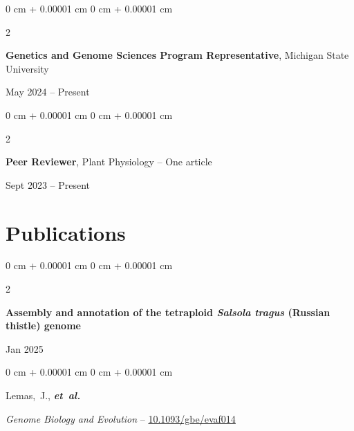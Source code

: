 \documentclass[10pt, letterpaper]{article}
\newenvironment{onecolentry}{
    \begin{adjustwidth}{
        0 cm + 0.00001 cm
    }{
        0 cm + 0.00001 cm
    }
}{
    \end{adjustwidth}
} %
\newenvironment{twocolentry}[2][]{
    \onecolentry
    \def\secondColumn{#2}
    \setcolumnwidth{\fill, 4.5 cm}
    \begin{paracol}{2}
}{
    \switchcolumn \raggedleft \secondColumn
    \end{paracol}
    \endonecolentry
} %
\begin{document}
        
        \begin{samepage} 
            \begin{twocolentry}{
                May 2024 – Present
                }
                \textbf{Genetics and Genome Sciences Program Representative}, Michigan State University
            \end{twocolentry}
        \end{samepage}  


        \vspace{0.2 cm}


        \begin{samepage} 
            \begin{twocolentry}{
                Sept 2023 – Present
                }
                \textbf{Peer Reviewer}, Plant Physiology -- One article
            \end{twocolentry}
        \end{samepage}
      
        

            
    \section{Publications}





        \begin{samepage}
            \begin{twocolentry}{
                Jan 2025
                }
                \textbf{Assembly and annotation of the tetraploid \textit{Salsola tragus} (Russian thistle) genome}
            \end{twocolentry}

            \vspace{0.10 cm}
            
            \begin{onecolentry}
                \mbox{Lemas, J.}, \mbox{\textbf{\textit{et al.}}}

                \vspace{0.10 cm}
                
                \textit{Genome Biology and Evolution} -- \href{https://doi.org/10.1093/gbe/evaf014}{10.1093/gbe/evaf014}
            \end{onecolentry}
        \end{samepage}


        \vspace{0.2 cm}
\end{document}

